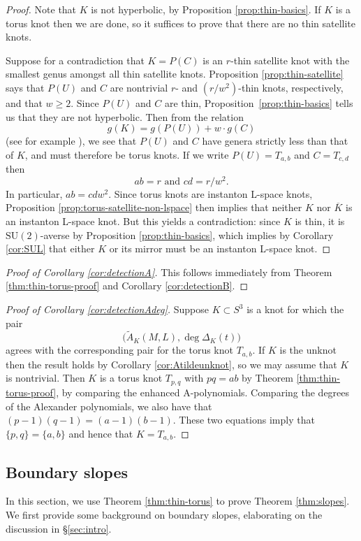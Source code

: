 \documentclass[11pt]{amsart}
\numberwithin{equation}{section}
\numberwithin{theorem}{section}
\theoremstyle{definition}
\newcommand\SU{\mathrm{SU}}
\newcommand{\mirror}[1]{\overline{#1}}
\begin{document}
\begin{proof}
Note that $K$ is not hyperbolic, by Proposition \ref{prop:thin-basics}. If $K$ is a torus knot then we are done, so it suffices to prove that there are no thin satellite knots. 

Suppose for a contradiction that $K=P(C)$ is an $r$-thin satellite knot with the smallest genus amongst all thin satellite knots.  Proposition \ref{prop:thin-satellite} says that $P(U)$ and $C$ are  nontrivial $r$- and $(r/w^2)$-thin knots, respectively, and that $w\geq 2$. Since $P(U)$ and $C$ are thin, Proposition~\ref{prop:thin-basics} tells us that they are not hyperbolic.  Then from the relation
\[ g(K) = g(P(U)) + w\cdot g(C) \]
(see for example \cite[Proposition~2.10]{burde-zieschang}), we see that $P(U)$ and $C$ have  genera strictly less than that of $K$, and must therefore be torus knots. If we write $P(U) = T_{a,b}$ and $C = T_{c,d}$ then \[ab =r \textrm{ and } cd = r/w^2.\] In particular, $ab = cdw^2$. Since torus knots are instanton L-space knots, Proposition \ref{prop:torus-satellite-non-lspace} then implies that neither $K$ nor $\mirror{K}$ is an instanton L-space knot. But this yields a contradiction: since $K$ is thin, it is $\SU(2)$-averse by Proposition \ref{prop:thin-basics}, which implies by Corollary \ref{cor:SUL} that either $K$ or its mirror must be an instanton L-space knot. 
\end{proof}

\begin{proof}[Proof of Corollary \ref{cor:detectionA}]
This follows immediately from Theorem \ref{thm:thin-torus-proof} and Corollary \ref{cor:detectionB}.
\end{proof}

\begin{proof}[Proof of Corollary \ref{cor:detectionAdeg}]
Suppose $K\subset S^3$ is a knot for which the pair  \[\big(\tilde{A}_K(M,L), \deg \Delta_K(t)\big)\] agrees with the corresponding pair for the torus knot $T_{a,b}$. If $K$ is the unknot then the result holds by Corollary \ref{cor:Atildeunknot}, so we may assume that $K$ is nontrivial. Then $K$ is a torus knot $T_{p,q}$ with $pq=ab$ by Theorem \ref{thm:thin-torus-proof}, by comparing the enhanced A-polynomials. Comparing the degrees of the Alexander polynomials, we also have that $(p-1)(q-1) = (a-1)(b-1).$ These two equations imply that $\{p,q\}=\{a,b\}$ and hence that $K = T_{a,b}$.
\end{proof}



\subsection{Boundary slopes} In this section, we use Theorem \ref{thm:thin-torus} to prove Theorem \ref{thm:slopes}. We first provide some background on boundary slopes, elaborating on the discussion in \S\ref{sec:intro}.
\end{document}
